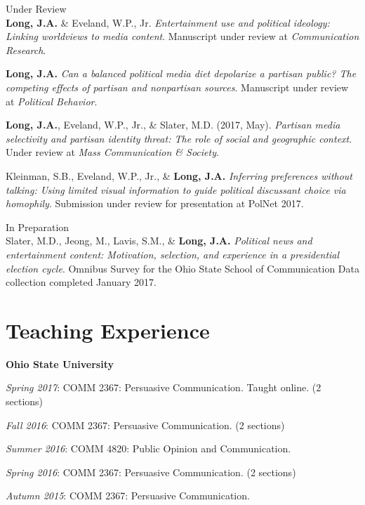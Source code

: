 \documentclass[margin,line]{res}
\begin{document}
\begin{resume}
{\sc Under Review}\\
\textbf{Long, J.A.} \& Eveland, W.P., Jr. \emph{Entertainment use and political ideology: Linking worldviews to media content}. Manuscript under review at \emph{Communication Research}.

\textbf{Long, J.A.} \emph{Can a balanced political media diet depolarize a partisan public? The competing effects of partisan and nonpartisan sources}. Manuscript under review at \emph{Political Behavior}.

{\bf Long, J.A.}, Eveland, W.P., Jr., \& Slater, M.D. (2017, May). \emph{Partisan media selectivity and partisan identity threat: The role of social and geographic context}. Under review at \emph{Mass Communication \& Society}.

Kleinman, S.B., Eveland, W.P., Jr., \& \textbf{Long, J.A.} \emph{Inferring preferences without talking: Using limited visual information to guide political discussant choice via homophily}. Submission under review for presentation at PolNet 2017.

{\sc In Preparation}\\
Slater, M.D., Jeong, M., Lavis, S.M., \& {\bf Long, J.A.} \emph{Political news and entertainment content: Motivation, selection, and experience in a presidential election cycle}. Omnibus Survey for the Ohio State School of Communication Data collection completed January 2017. 



\section{\sc Teaching Experience}
{\bf Ohio State University}

\vspace*{-2.5mm}
\emph{Spring 2017}: COMM 2367: Persuasive Communication. Taught online. (2 sections)

\vspace*{-2.5mm}
\emph{Fall 2016}: COMM 2367: Persuasive Communication. (2 sections)

\vspace*{-2.5mm}
\emph{Summer 2016}: COMM 4820: Public Opinion and Communication.

\vspace*{-2.5mm}
\emph{Spring 2016}: COMM 2367: Persuasive Communication. (2 sections)

\vspace*{-2.5mm}
\emph{Autumn 2015}: COMM 2367: Persuasive Communication.


\end{resume}
\end{document}
